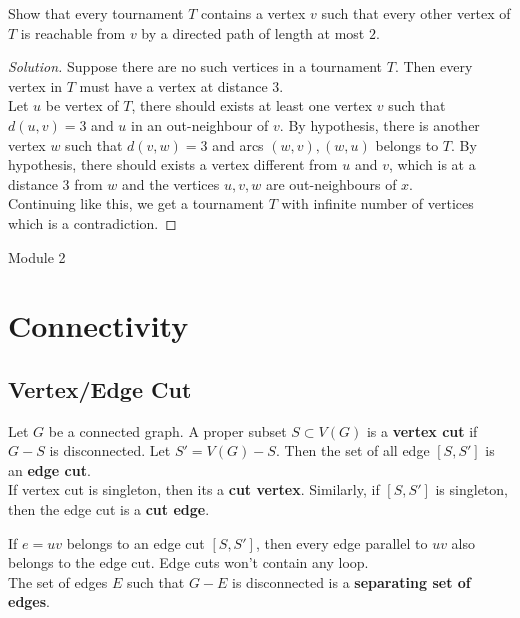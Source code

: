 \begin{exercise}
	Show that every tournament $T$ contains a vertex $v$ such that every other vertex of $T$ is reachable from $v$ by a directed path of length at most $2$.
\end{exercise}
\begin{proof}[Solution]
	Suppose there are no such vertices in a tournament $T$. Then every vertex in $T$ must have a vertex at distance $3$.\\

	Let $u$ be vertex of $T$, there should exists at least one vertex $v$ such that $d(u,v) = 3$ and $u$ in an out-neighbour of $v$. By hypothesis, there is another vertex $w$ such that $d(v,w) = 3$ and arcs $(w,v), (w,u)$ belongs to $T$. By hypothesis, there should exists a vertex different from $u$ and $v$, which is at a distance $3$ from $w$ and the vertices $u,v,w$ are out-neighbours of $x$.\\

	Continuing like this, we get a tournament $T$ with infinite number of vertices which is a contradiction.
\end{proof}
\pagebreak

{\Large Module 2}
\section{Connectivity}
\setcounter{subsection}{1}
\subsection{Vertex/Edge Cut}
\begin{definition}
	Let $G$ be a connected graph. A proper subset $S \subset V(G)$ is a \textbf{vertex cut} if $G-S$ is disconnected. Let $S' = V(G)-S$. Then the set of all edge $[S,S']$ is an \textbf{edge cut}.\\

	If vertex cut is singleton, then its a \textbf{cut vertex}. Similarly, if $[S,S']$ is singleton, then the edge cut is a \textbf{cut edge}.
\end{definition}
\begin{remark}
	If $e = uv$ belongs to an edge cut $[S,S']$, then every edge parallel to $uv$ also belongs to the edge cut. Edge cuts won't contain any loop.\\

	The set of edges $E$ such that $G-E$ is disconnected is a \textbf{separating set of edges}.
\end{remark}

